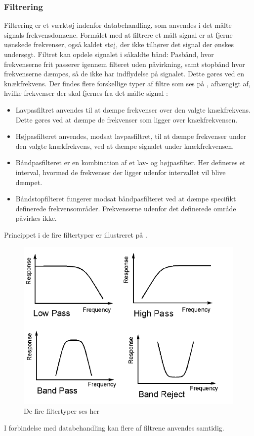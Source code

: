 \subsubsection{Filtrering}
Filtrering er et værktøj indenfor databehandling, som anvendes i det målte signals frekvensdomæne. Formålet med at filtrere et målt signal er at fjerne uønskede frekvenser, også kaldet støj, der ikke tilhører det signal der ønskes undersøgt. Filtret kan opdele signalet i såkaldte bånd: Pasbånd, hvor frekvenserne frit passerer igennem filteret uden påvirkning, samt stopbånd hvor frekvenserne dæmpes, så de ikke har indflydelse på signalet. Dette gøres ved en knækfrekvens.
Der findes flere forskellige typer af filtre som ses på , afhængigt af, hvilke frekvenser der skal fjernes fra det målte signal \cite{Devasahayam2000}:

\begin{itemize}
	\item Lavpasfiltret anvendes til at dæmpe frekvenser over den valgte knækfrekvens. Dette gøres ved at dæmpe de frekvenser som ligger over knækfrekvensen.
	\item Højpasfilteret anvendes, modsat lavpasfiltret, til at dæmpe frekvenser under den valgte knækfrekvens, ved at dæmpe signalet under knækfrekvensen.
	\item Båndpasfilteret er en kombination af et lav- og højpasfilter.  Her defineres et interval, hvormed de frekvenser der ligger udenfor intervallet vil blive dæmpet.
	\item Båndstopfilteret fungerer modsat båndpasfilteret ved at dæmpe specifikt definerede frekvensområder. Frekvenserne udenfor det definerede område påvirkes ikke. 
\end{itemize}
  
Princippet i de fire filtertyper er illustreret på .
\begin{figure}[H]
\centering
\includegraphics[scale=0.8]{figures/bproblemanalyse/filtertyper.png}
\caption{De fire filtertyper ses her \cite{2. semester kristian}}
\label{filtertyper}
\end{figure}
I forbindelse med databehandling kan flere af filtrene anvendes samtidig. \cite{Devasahayam2000}

